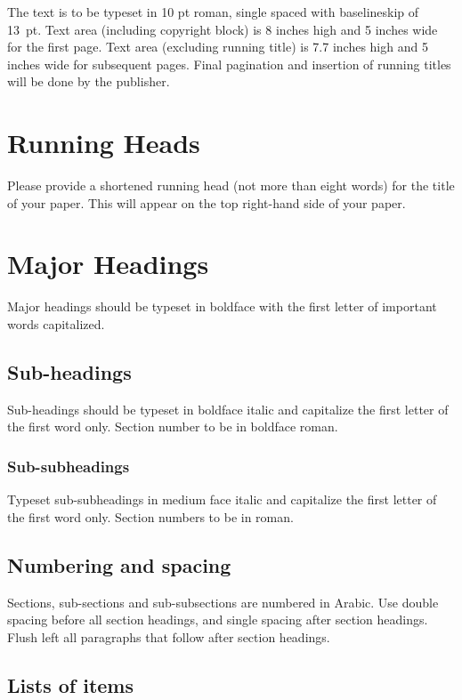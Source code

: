 \documentclass{ws-ijitdm}
\begin{document}
The text is to be typeset in 10 pt roman, single spaced with
baselineskip of 13~pt. Text area (including copyright block) 
is 8 inches high and 5 inches wide for the first page.  Text area
(excluding running title) is 7.7 inches high and 5 inches wide for
subsequent pages.  Final pagination and insertion of running titles
will be done by the publisher.

\section{Running Heads}

Please provide a shortened running head (not more than eight words) for
the title of your paper. This will appear on the top right-hand side
of your paper.

\section{Major Headings}

Major headings should be typeset in boldface with the first
letter of important words capitalized.

\subsection{Sub-headings}

Sub-headings should be typeset in boldface italic and capitalize
the first letter of the first word only. Section number to be in
boldface roman.

\subsubsection{Sub-subheadings}

Typeset sub-subheadings in medium face italic and capitalize the
first letter of the first word only. Section numbers to be in
roman.

\subsection{Numbering and spacing}

Sections, sub-sections and sub-subsections are numbered in
Arabic.  Use double spacing before all section headings, and
single spacing after section headings. Flush left all paragraphs
that follow after section headings.

\subsection{Lists of items}
\end{document}
